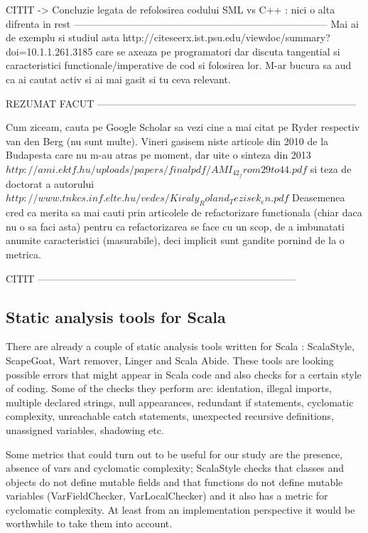 \documentclass{article}
\begin{document}
CITIT -> Concluzie legata de refolosirea codului SML vs C++ : nici o alta difrenta in rest        
-----------------------------------------------------------------------------
Mai ai de exemplu si studiul asta
        http://citeseerx.ist.psu.edu/viewdoc/summary?doi=10.1.1.261.3185
care se axeaza pe programatori dar discuta tangential si caracteristici
functionale/imperative de cod si folosirea lor.
M-ar bucura sa aud ca ai cautat activ si ai mai gasit si tu ceva relevant.


REZUMAT FACUT
------------------------------------------------------------------------------

Cum ziceam, cauta pe Google Scholar sa vezi cine a mai citat pe
Ryder respectiv van den Berg (nu sunt multe). Vineri gasisem niste
articole din 2010 de la Budapesta care nu m-au atras pe moment,
dar uite o sinteza din 2013
        $http://ami.ektf.hu/uploads/papers/finalpdf/AMI_42_from29to44.pdf$
si teza de doctorat a autorului
$        http://www.tnkcs.inf.elte.hu/vedes/Kiraly_Roland_Tezisek_en.pdf$
Deasemenea cred ca merita sa mai cauti prin articolele de refactorizare
functionala (chiar daca nu o sa faci asta) pentru ca refactorizarea
se face cu un scop, de a imbunatati anumite caracteristici (masurabile),
deci implicit sunt gandite pornind de la o metrica.

CITIT
------------------------------------------------------------------------------
\subsection {Static analysis tools for Scala}
There are already a couple of static analysis tools written for Scala : ScalaStyle, ScapeGoat, Wart remover, Linger and Scala Abide. These tools are looking possible errors that might appear in Scala code and also checks for a certain style of coding. Some of the checks they perform are: identation, illegal imports, multiple declared strings, null appearances, redundant if statements, cyclomatic complexity, unreachable catch statements, unexpected recursive definitions, unassigned variables, shadowing etc. \par

Some metrics that could turn out to be useful for our study are  the presence, absence of vars and cyclomatic complexity; ScalaStyle checks that classes and objects do not define mutable fields and that functions do not define mutable variables (VarFieldChecker, VarLocalChecker) \cite{scalastyle} and it also has a metric for cyclomatic complexity. At least from an implementation perspective it would be worthwhile to take them into account.\par
\end{document}
